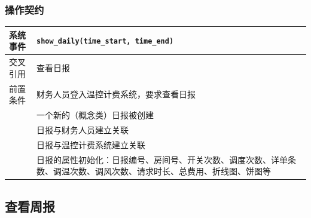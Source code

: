 \documentclass[black,normal,cn]{elegantnote}
\newcommand{\code}[1]{\colorbox{light-gray}{\texttt{#1}}}
\begin{document}
\subsubsection{操作契约}

\begin{center}
    \begin{tabular}{|>{\centering}m{}|m{}|}
        \hline
        系统事件                  & \multicolumn{1}{l|}{\code{show\_daily(time\_start, time\_end)}}                                                        \\
        \hline
        交叉引用                  & 查看日报                                                                                                               \\
        \hline
        前置条件                  & 财务人员登入温控计费系统，要求查看日报                                                                                 \\
        \hline
        \multirow{4}{*}{后置条件} & 一个新的（概念类）日报被创建                                                                                           \\
        \cline{2-2}
                                  & 日报与财务人员建立关联                                                                                                 \\
        \cline{2-2}
                                  & 日报与温控计费系统建立关联                                                                                             \\
        \cline{2-2}
                                  & 日报的属性初始化：日报编号、房间号、开关次数、调度次数、详单条数、调温次数、调风次数、请求时长、总费用、折线图、饼图等 \\
        \hline
    \end{tabular}
\end{center}


\subsection{查看周报}
\end{document}
